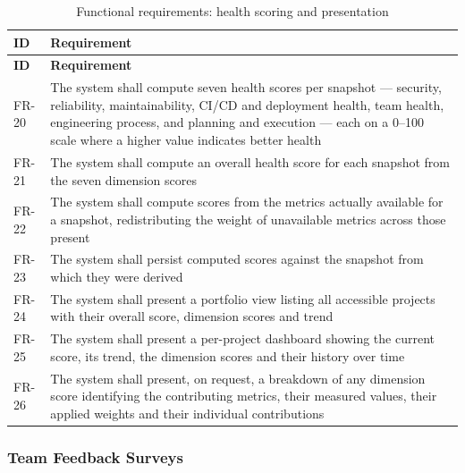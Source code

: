 \begin{longtable}{
  >{\raggedright\arraybackslash}p{}
  >{\raggedright\arraybackslash}p{}
}
\caption{Functional requirements: health scoring and presentation}
\label{tab:fr-scoring}\\
\toprule
\textbf{ID} & \textbf{Requirement} \\
\midrule
\endfirsthead
\toprule
\textbf{ID} & \textbf{Requirement} \\
\midrule
\endhead
\bottomrule
\endlastfoot
FR-20 & The system shall compute seven health scores per snapshot --- security,
reliability, maintainability, CI/CD and deployment health, team health, engineering
process, and planning and execution --- each on a 0--100 scale where a higher value
indicates better health \\
\addlinespace
FR-21 & The system shall compute an overall health score for each snapshot from the
seven dimension scores \\
\addlinespace
FR-22 & The system shall compute scores from the metrics actually available for a
snapshot, redistributing the weight of unavailable metrics across those present \\
\addlinespace
FR-23 & The system shall persist computed scores against the snapshot from which they
were derived \\
\addlinespace
FR-24 & The system shall present a portfolio view listing all accessible projects
with their overall score, dimension scores and trend \\
\addlinespace
FR-25 & The system shall present a per-project dashboard showing the current score,
its trend, the dimension scores and their history over time \\
\addlinespace
FR-26 & The system shall present, on request, a breakdown of any dimension score
identifying the contributing metrics, their measured values, their applied weights
and their individual contributions \\
\end{longtable}

\subsubsection{Team Feedback Surveys}

